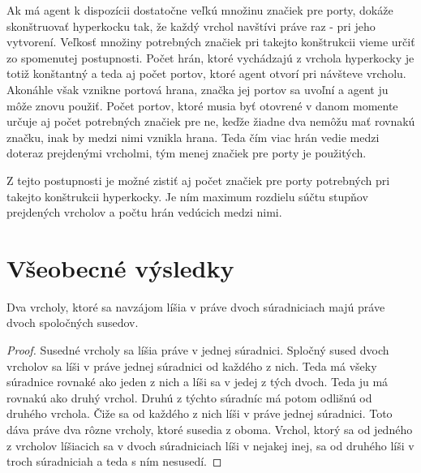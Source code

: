 Ak má agent k dispozícii dostatočne veľkú množinu značiek pre porty, dokáže
skonštruovať hyperkocku tak, že každý vrchol navštívi práve raz - pri jeho
vytvorení. Veľkosť množiny potrebných značiek pri takejto konštrukcii vieme 
určiť zo spomenutej postupnosti. Počet hrán, ktoré vychádzajú z vrchola
hyperkocky je totiž konštantný a teda aj počet portov, ktoré agent otvorí
pri návšteve vrcholu. Akonáhle však vznikne portová hrana, značka jej portov
sa uvoľní a agent ju môže znovu použiť. Počet portov, ktoré musia byť
otovrené v danom momente určuje aj počet potrebných značiek pre ne, keďže
žiadne dva nemôžu mať rovnakú značku, inak by medzi nimi vznikla hrana. Teda
čím viac hrán vedie medzi doteraz prejdenými vrcholmi, tým menej značiek pre
porty je použitých.

Z tejto postupnosti je možné zistiť aj počet značiek pre porty potrebných
pri takejto konštrukcii hyperkocky. Je ním maximum rozdielu súčtu stupňov
prejdených vrcholov a počtu hrán vedúcich medzi nimi.

\section{Všeobecné výsledky}

\begin{lem}
Dva vrcholy, ktoré sa navzájom líšia v práve dvoch súradniciach majú práve dvoch
spoločných susedov.
\end{lem}
\begin{proof}
Susedné vrcholy sa líšia práve v jednej súradnici. Spločný sused dvoch
vrcholov sa líši v práve jednej súradnici od každého z nich. Teda má všeky
súradnice rovnaké ako jeden z nich a líši sa v jedej z tých dvoch. Teda ju
má rovnakú ako druhý vrchol. Druhú z týchto súradníc má potom odlišnú od
druhého vrchola. Čiže sa od každého z nich líši v práve jednej súradnici.
Toto dáva práve dva rôzne vrcholy, ktoré susedia z oboma. Vrchol, ktorý
sa od jedného z vrcholov líšiacich sa v dvoch súradniciach líši v nejakej
inej, sa od druhého líši v troch súradniciah a teda s ním nesusedí.
\end{proof}

